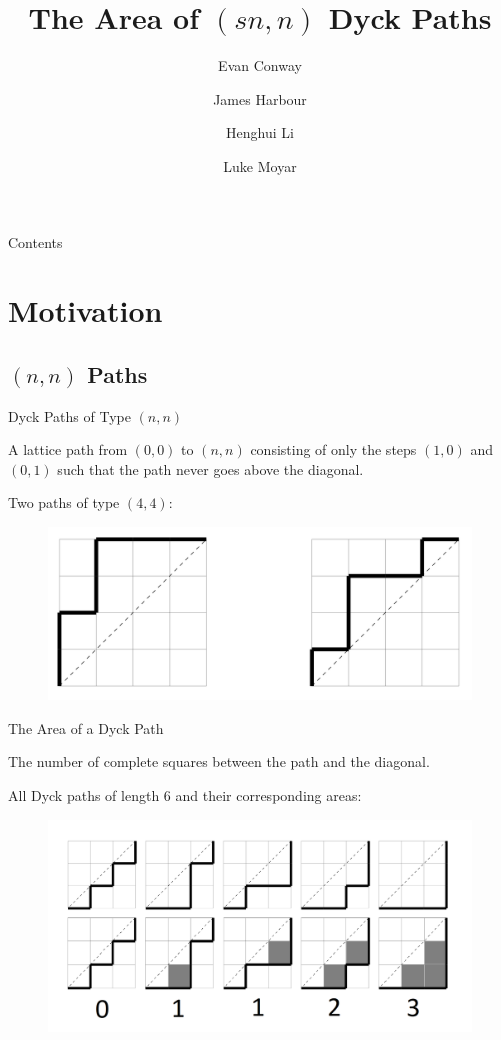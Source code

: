 \documentclass{beamer}
\title{The Area of $(sn,n)$ Dyck Paths}
\author{Evan Conway \and James Harbour \and Henghui Li \and Luke Moyar}
\begin{document}
\frame{\titlepage}

\begin{frame}{Contents}
\tableofcontents
\end{frame}

\section{Motivation}
\subsection{$(n, n)$ Paths}

\begin{frame}{Dyck Paths of Type $(n,n)$}
\begin{definition}
A lattice path from $(0, 0)$ to $(n, n)$ consisting of only the steps $(1, 0)$ and $(0, 1)$ such that the path never goes above the diagonal.
\end{definition}

\begin{example}
Two paths of type $(4,4)$:
\begin{figure}
    \centering
    \includegraphics[width=0.85\linewidth, angle = 180]{Dyck_Examples_1.png}
\end{figure}
\end{example}
\end{frame}

\begin{frame}{The Area of a Dyck Path}
\begin{definition}
The number of complete squares between the path and the diagonal. 
\end{definition}
\begin{example}
All Dyck paths of length 6 and their corresponding areas:
\begin{figure}
    \centering
    \includegraphics[width=0.75\linewidth]{path_and_og_area.png}
\end{figure}
\end{example}
\end{frame}
\end{document}

